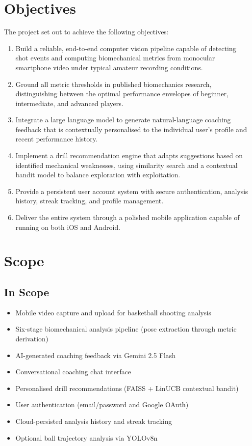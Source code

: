 \section{Objectives}
\label{sec:objectives}

The project set out to achieve the following objectives:

\begin{enumerate}[label=\arabic*.]
  \item Build a reliable, end-to-end computer vision pipeline capable of detecting shot events and computing biomechanical metrics from monocular smartphone video under typical amateur recording conditions.
  \item Ground all metric thresholds in published biomechanics research, distinguishing between the optimal performance envelopes of beginner, intermediate, and advanced players.
  \item Integrate a large language model to generate natural-language coaching feedback that is contextually personalised to the individual user's profile and recent performance history.
  \item Implement a drill recommendation engine that adapts suggestions based on identified mechanical weaknesses, using similarity search and a contextual bandit model to balance exploration with exploitation.
  \item Provide a persistent user account system with secure authentication, analysis history, streak tracking, and profile management.
  \item Deliver the entire system through a polished mobile application capable of running on both iOS and Android.
\end{enumerate}

\section{Scope}
\label{sec:scope}

\subsection{In Scope}

\begin{itemize}
  \item Mobile video capture and upload for basketball shooting analysis
  \item Six-stage biomechanical analysis pipeline (pose extraction through metric derivation)
  \item AI-generated coaching feedback via Gemini 2.5 Flash
  \item Conversational coaching chat interface
  \item Personalised drill recommendations (FAISS + LinUCB contextual bandit)
  \item User authentication (email/password and Google OAuth)
  \item Cloud-persisted analysis history and streak tracking
  \item Optional ball trajectory analysis via YOLOv8n
\end{itemize}

